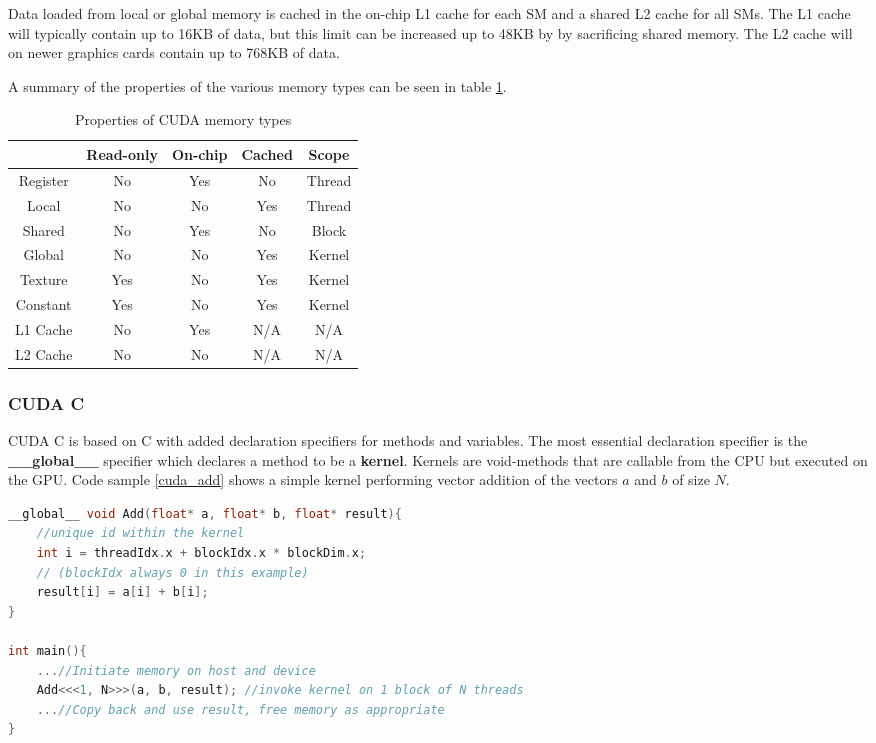 Data loaded from local or global memory is cached in the on-chip L1 cache for each SM and a shared L2 cache for all SMs.
The L1 cache will typically contain up to 16KB of data, but this limit can be increased up to 48KB by by sacrificing shared memory.
The L2 cache will on newer graphics cards contain up to 768KB of data.

A summary of the properties of the various memory types can be seen in table \ref{table:memorytypes}.

\begin{table}[h!]
\centering
\begin{tabular}{ | c | c | c | c | c | }
  \hline
           & Read-only & On-chip   & Cached & Scope  \\ \hline
  Register & No        & Yes       & No     & Thread \\ \hline
  Local    & No        & No        & Yes    & Thread \\ \hline
  Shared   & No        & Yes       & No     & Block  \\ \hline
  Global   & No        & No        & Yes    & Kernel \\ \hline
  Texture  & Yes       & No        & Yes    & Kernel \\ \hline
  Constant & Yes       & No        & Yes    & Kernel \\ \hline
  L1 Cache & No        & Yes       & N/A    & N/A    \\ \hline
  L2 Cache & No        & No        & N/A    & N/A    \\ \hline

\end{tabular}
\caption{Properties of CUDA memory types\label{table:memorytypes}}
\end{table}

\subsubsection{CUDA C}
CUDA C is based on C with added declaration specifiers for methods and variables. 
The most essential declaration specifier is the \textbf{\_\_global\_\_} specifier which declares a method to be a \textbf{kernel}. 
Kernels are void-methods that are callable from the CPU but executed on the GPU. 
Code sample \ref{cuda_add} shows a simple kernel performing vector addition of the vectors $a$ and $b$ of size $N$.

\begin{lstlisting}[language=C++, caption=CUDA C addition kernel, label=cuda_add]
__global__ void Add(float* a, float* b, float* result){
	//unique id within the kernel
	int i = threadIdx.x + blockIdx.x * blockDim.x;
	// (blockIdx always 0 in this example)
	result[i] = a[i] + b[i];
}

int main(){
	...//Initiate memory on host and device
	Add<<<1, N>>>(a, b, result); //invoke kernel on 1 block of N threads
	...//Copy back and use result, free memory as appropriate
}
\end{lstlisting}

